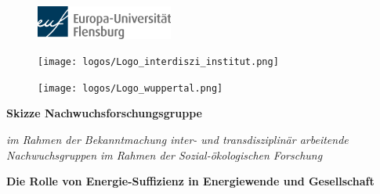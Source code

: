 
\thispagestyle{empty}
\begin{center}

\begin{figure}[htb]
    \centering
    \begin{minipage}[c]{0.3\linewidth}
        \centering
        \includegraphics[width=4.5cm]{logos/europa-universitaet-flensburg-hauptlogo-rgb-600dpi.png}
    \end{minipage}
    \hfill
    \begin{minipage}[c]{0.35\linewidth}
        \centering
        \texttt{[image: logos/Logo\_interdiszi\_institut.png]}
    \end{minipage}
    \hfill
    \begin{minipage}[c]{0.3\linewidth}
        \centering
        \texttt{[image: logos/Logo\_wuppertal.png]}
    \end{minipage}
\end{figure}

\vspace*{1 cm}

{\LARGE\textbf{\textsf{Skizze Nachwuchsforschungsgruppe}}

\textsf{\textit{im Rahmen der Bekanntmachung \glqq inter- und transdisziplinär arbeitende Nachwuchsgruppen im Rahmen der Sozial-ökologischen Forschung\grqq} }
}

\vspace{0.5cm}

{\Huge
\textbf{\textsf{Die Rolle von Energie-Suffizienz in Energiewende und Gesellschaft}}

}
\end{center}
